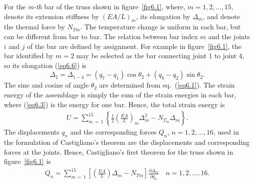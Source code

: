 \documentclass{AeroStructure-ERJohnson}
\begin{document}
For the \textit{m-th} bar of the truss shown in figure~\ref{fig6.1}, where, $m = 1, 2,\ldots, 15$, denote its extension stiffness by $(E A / L)_{m}$, its elongation by $\Delta_{m}$, and denote the thermal force by $N_{T m}$. The temperature change is uniform in each bar, but can be different from bar to bar. The relation between bar index $m$ and the joints $i$ and $j$ of the bar are defined by assignment. For example in figure~\ref{fig6.1}, the bar identified by $m = 2$ may be selected as the bar connecting joint 1 to joint 4, so its elongation (\ref{eq6.6}) is
\[
\Delta_{2}=\Delta_{1-4}=\left(q_{7}-q_{1}\right) \cos \theta_{2}+\left(q_{8}-q_{2}\right) \sin \theta_{2}.
\]
The sine and cosine of angle $\theta_2$ are determined from eq.~(\ref{eq6.1}). The strain energy of the assemblage is simply the sum of the strain energies in each bar, where (\ref{eq6.3}) is the energy for one bar. Hence, the total strain energy is
\begin{align}\label{eq6.7}
U=\sum_{m\,=\,1}^{15}\left\{\frac{1}{2}\left(\frac{E A}{L}\right)_{m} \Delta_{m}^{2}-N_{T_{m}} \Delta_{m}\right\} .
\end{align}
 The displacements $q_{n}$ and the corresponding forces $Q_{n}$, $n=1,2, \ldots, 16$, used in the formulation of Castigliano's theorem are the displacements and corresponding forces at the joints. Hence, Castigliano's first theorem for the truss shown in figure~\ref{fig6.1} is
\begin{align}\label{eq6.8}
Q_{n}=\sum_{m\,=\,1}^{15}\left[\left(\frac{E A}{L}\right) \Delta_{m}-N_{T m}\right] \frac{\partial \Delta_{m}}{\partial q_{n}} \quad n=1,2, \ldots, 16.
\end{align}
\end{document}
